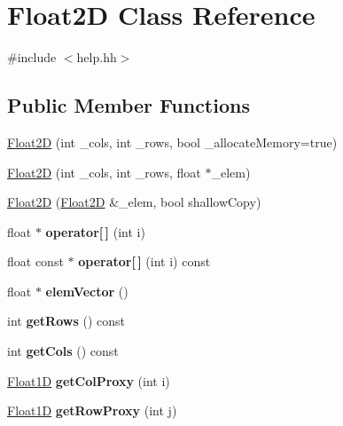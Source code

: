 \hypertarget{classFloat2D}{\section{Float2\-D Class Reference}
\label{classFloat2D}
}


{\ttfamily \#include $<$help.\-hh$>$}

\subsection*{Public Member Functions}
\begin{DoxyCompactItemize}
\item 
\hyperlink{classFloat2D_aceac75782e5db5cb644a893de73f7933}{Float2\-D} (int \-\_\-cols, int \-\_\-rows, bool \-\_\-allocate\-Memory=true)
\item 
\hyperlink{classFloat2D_a51ccca3defa8be28c89f63f1768a79b0}{Float2\-D} (int \-\_\-cols, int \-\_\-rows, float $\ast$\-\_\-elem)
\item 
\hyperlink{classFloat2D_aa4c91cf3f61da6180d2d3e92699d7c92}{Float2\-D} (\hyperlink{classFloat2D}{Float2\-D} \&\-\_\-elem, bool shallow\-Copy)
\item 
\hypertarget{classFloat2D_a0c514deed419976c1de95a476148edb7}{float $\ast$ {\bfseries operator\mbox{[}$\,$\mbox{]}} (int i)}\label{classFloat2D_a0c514deed419976c1de95a476148edb7}

\item 
\hypertarget{classFloat2D_a2890be398d2b6381253169f26225e93b}{float const $\ast$ {\bfseries operator\mbox{[}$\,$\mbox{]}} (int i) const }\label{classFloat2D_a2890be398d2b6381253169f26225e93b}

\item 
\hypertarget{classFloat2D_ab7ea635b12555d35bae9c4ef87024b07}{float $\ast$ {\bfseries elem\-Vector} ()}\label{classFloat2D_ab7ea635b12555d35bae9c4ef87024b07}

\item 
\hypertarget{classFloat2D_a9f523397af4e14fb2006ad4484f95380}{int {\bfseries get\-Rows} () const }\label{classFloat2D_a9f523397af4e14fb2006ad4484f95380}

\item 
\hypertarget{classFloat2D_af029eb7eb99dc96e95095796d7ea93fa}{int {\bfseries get\-Cols} () const }\label{classFloat2D_af029eb7eb99dc96e95095796d7ea93fa}

\item 
\hypertarget{classFloat2D_abea4f5de8e07341d0564a87065af6091}{\hyperlink{classFloat1D}{Float1\-D} {\bfseries get\-Col\-Proxy} (int i)}\label{classFloat2D_abea4f5de8e07341d0564a87065af6091}

\item 
\hypertarget{classFloat2D_a6c3329adba1854ea3e9589fd7271765b}{\hyperlink{classFloat1D}{Float1\-D} {\bfseries get\-Row\-Proxy} (int j)}\label{classFloat2D_a6c3329adba1854ea3e9589fd7271765b}

\end{DoxyCompactItemize}


